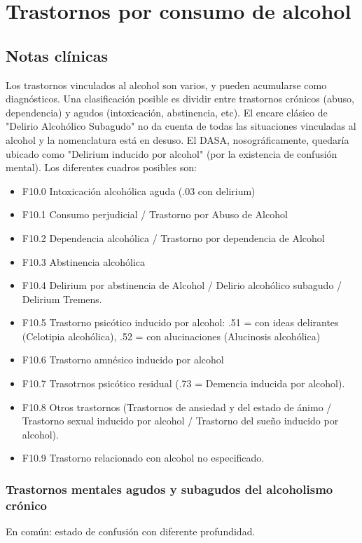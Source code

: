 \chapter{Trastornos por consumo de alcohol}
\section*{Notas clínicas}
Los trastornos vinculados al alcohol son varios, y pueden acumularse como diagnósticos. Una clasificación posible es dividir entre trastornos crónicos (abuso, dependencia) y agudos (intoxicación, abstinencia, etc). El encare clásico de "Delirio Alcohólico Subagudo" no da cuenta de todas las situaciones vinculadas al alcohol y la nomenclatura está en desuso. El DASA, nosográficamente, quedaría ubicado como "Delirium inducido por alcohol" (por la existencia de confusión mental). Los diferentes cuadros posibles son\cite{cie102000}:
\begin{itemize}
\item F10.0 Intoxicación alcohólica aguda (.03 con delirium)
\item F10.1 Consumo perjudicial / Trastorno por Abuso de Alcohol
\item F10.2 Dependencia alcohólica / Trastorno por dependencia de Alcohol
\item F10.3 Abstinencia alcohólica
\item F10.4 Delirium por abstinencia de Alcohol / Delirio alcohólico subagudo / Delirium Tremens.
\item F10.5 Trastorno psicótico inducido por alcohol: .51 = con ideas delirantes (Celotipia alcohólica), .52 = con alucinaciones (Alucinosis alcohólica)
\item F10.6 Trastorno amnésico inducido por alcohol
\item F10.7 Trasotrnos psicótico residual (.73 = Demencia inducida por alcohol).
\item F10.8 Otros trastornos (Trastornos de ansiedad y del estado de ánimo / Trastorno sexual inducido por alcohol / Trastorno del sueño inducido por alcohol).
\item F10.9 Trastorno relacionado con alcohol no especificado.
\end{itemize}
\subsection*{Trastornos mentales agudos y subagudos del alcoholismo crónico}
En común: estado de confusión con diferente profundidad\cite{ey1996}.

